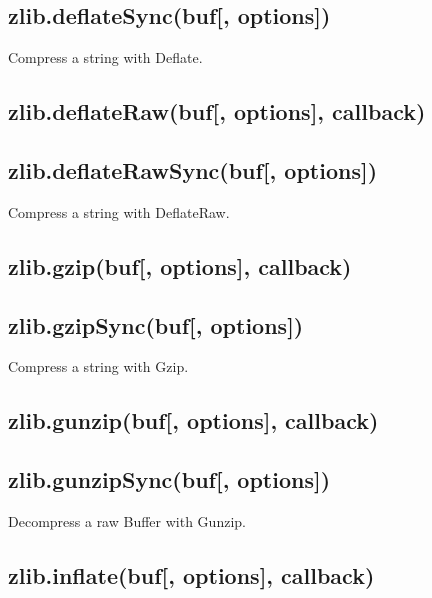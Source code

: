 \subsection{zlib.deflateSync(buf{[},
options{]})}\label{zlib.deflatesyncbuf-options}

Compress a string with Deflate.

\subsection{zlib.deflateRaw(buf{[}, options{]},
callback)}\label{zlib.deflaterawbuf-options-callback}

\subsection{zlib.deflateRawSync(buf{[},
options{]})}\label{zlib.deflaterawsyncbuf-options}

Compress a string with DeflateRaw.

\subsection{zlib.gzip(buf{[}, options{]},
callback)}\label{zlib.gzipbuf-options-callback}

\subsection{zlib.gzipSync(buf{[},
options{]})}\label{zlib.gzipsyncbuf-options}

Compress a string with Gzip.

\subsection{zlib.gunzip(buf{[}, options{]},
callback)}\label{zlib.gunzipbuf-options-callback}

\subsection{zlib.gunzipSync(buf{[},
options{]})}\label{zlib.gunzipsyncbuf-options}

Decompress a raw Buffer with Gunzip.

\subsection{zlib.inflate(buf{[}, options{]},
callback)}\label{zlib.inflatebuf-options-callback}

